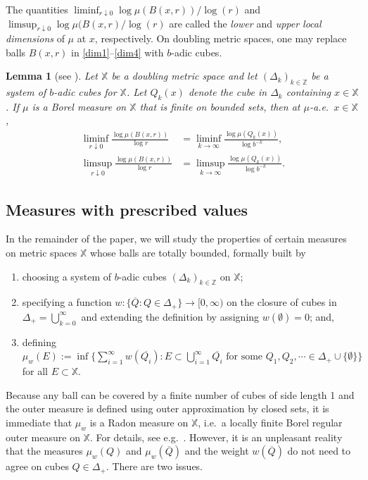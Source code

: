 \documentclass[12pt]{amsart}
\newtheorem{lemma}[theorem]{Lemma}
\theoremstyle{definition}
\theoremstyle{remark}
\newcommand{\ZZ}{\mathbb{Z}}
\newcommand{\XX}{\mathbb{X}}
\numberwithin{figure}{section}
\numberwithin{equation}{section}
\begin{document}
The quantities $\liminf_{r\downarrow 0} \log\mu(B(x,r))/\log(r)$ and $\limsup_{r\downarrow 0}\log\mu(B(x,r)/\log(r)$ are called the \emph{lower} and \emph{upper local dimensions} of $\mu$ at $x$, respectively.
On doubling metric spaces, one may replace balls $B(x,r)$ in \eqref{dim1}--\eqref{dim4} with $b$-adic cubes.

\begin{lemma}[see {\cite[Proposition 3.1]{KRS-multifractal}}]  Let $\XX$ be a doubling metric space and let $(\Delta_k)_{k\in\ZZ}$ be a system of $b$-adic cubes for $\XX$. Let $Q_k(x)$ denote the cube in $\Delta_k$ containing $x\in\XX$. If $\mu$ is a Borel measure on $\XX$ that is finite on bounded sets, then at $\mu$-a.e.~$x\in\XX$, \begin{align}
  \label{dim5} \liminf_{r\downarrow 0} \frac{\log \mu(B(x,r))}{\log r}&=\liminf_{k\rightarrow\infty} \frac{\log \mu(Q_k(x))}{\log b^{-k}}, \\
  \label{dim6} \limsup_{r\downarrow 0} \frac{\log \mu(B(x,r))}{\log r}&=\limsup_{k\rightarrow\infty} \frac{\log \mu(Q_k(x))}{\log b^{-k}}.
\end{align}
\end{lemma}

\subsection{Measures with prescribed values}

In the remainder of the paper, we will study the properties of certain measures on metric spaces $\XX$ whose balls are totally bounded, formally built by \begin{enumerate}
\item choosing a system of $b$-adic cubes $(\Delta_k)_{k\in\ZZ}$ on $\XX$;
\item specifying a function $w:\{\overline{Q}:Q\in\Delta_+\}\rightarrow [0,\infty)$ on the closure of cubes in $\Delta_+=\bigcup_{k=0}^\infty$ and extending the definition by assigning $w(\emptyset)=0$; and,
\item defining $\mu_w(E):=\inf\{\sum_{i=1}^\infty w(\overline{Q_i}): E\subset \bigcup_{i=1}^\infty \overline{Q_i}\text{ for some }Q_1, Q_2,\cdots \in \Delta_+\cup\{\emptyset\}\}$ for all $E\subset\XX$.
\end{enumerate} Because any ball can be covered by a finite number of cubes of side length 1 and the outer measure is defined using outer approximation by closed sets, it is immediate that $\mu_w$ is a Radon measure on $\XX$, i.e.~a locally finite Borel regular outer measure on $\XX$. For details, see e.g.~\cite{Rogers}. However, it is an unpleasant reality that the measures $\mu_w(Q)$ and $\mu_w(\overline{Q})$ and the weight $w(\overline{Q})$ do not need to agree on cubes $Q\in\Delta_+$. There are two issues.
\end{document}
